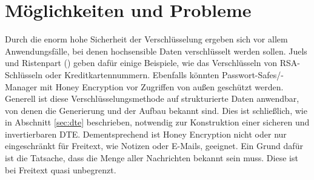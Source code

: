 \section{Möglichkeiten und Probleme}
\label{sec:probleme}
Durch die enorm hohe Sicherheit der Verschlüsselung ergeben sich vor allem Anwendungsfälle, bei denen hochsensible Daten verschlüsselt werden sollen. Juels und Ristenpart (\cite{EURO2014, IEEE2014}) geben dafür einige Beispiele, wie das Verschlüsseln von RSA-Schlüsseln oder Kreditkartennummern. Ebenfalls könnten Passwort-Safes/-Manager mit Honey Encryption vor Zugriffen von außen geschützt werden. Generell ist diese Verschlüsselungsmethode auf strukturierte Daten anwendbar, von denen die Generierung und der Aufbau bekannt sind. Dies ist schließlich, wie in Abschnitt \ref{sec:dte} beschrieben, notwendig zur Konstruktion einer sicheren und invertierbaren DTE. Dementsprechend ist Honey Encryption nicht oder nur eingeschränkt für Freitext, wie Notizen oder E-Mails, geeignet. Ein Grund dafür ist die Tatsache, dass die Menge aller Nachrichten bekannt sein muss. Diese ist bei Freitext quasi unbegrenzt.

